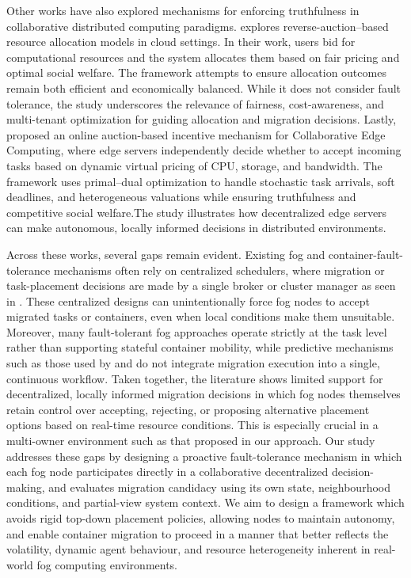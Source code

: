 \documentclass{article}
\begin{document}
Other works have also explored mechanisms for enforcing truthfulness in collaborative distributed computing paradigms. \cite{kumarFairResourceAllocation2021} explores reverse-auction–based resource allocation models in cloud settings. In their work, users bid for computational resources and the system allocates them based on fair pricing and optimal social welfare. The framework attempts to ensure allocation outcomes remain both efficient and economically balanced. While it does not consider fault tolerance, the study underscores the relevance of fairness, cost-awareness, and multi-tenant optimization for guiding allocation and migration decisions.
Lastly, \cite{heOnlineAuctionbasedIncentive2022} proposed an online auction-based incentive mechanism for Collaborative Edge Computing, where edge servers independently decide whether to accept incoming tasks based on dynamic virtual pricing of CPU, storage, and bandwidth. The framework uses primal–dual optimization to handle stochastic task arrivals, soft deadlines, and heterogeneous valuations while ensuring truthfulness and competitive social welfare.The study illustrates how decentralized edge servers can make autonomous, locally informed decisions in distributed environments.


Across these works, several gaps remain evident. Existing fog and container-fault-tolerance mechanisms often rely on centralized schedulers, where migration or task-placement decisions are made by a single broker or cluster manager as seen in \cite{palaContainerMigrationApproach2025}\cite{tranProactiveStatefulFaultTolerant2022}\cite{sharifFaulttolerantLoadBalancing2020}\cite{kashyapHybridApproachFaulttolerance2024b}. These centralized designs can unintentionally force fog nodes to accept migrated tasks or containers, even when local conditions make them unsuitable. Moreover, many fault-tolerant fog approaches operate strictly at the task level rather than supporting stateful container mobility, while predictive mechanisms such as those used by \cite{zhangFaultTolerantModelPerformance2022d} and \cite{mudassarDecentralizedLatencyAwareTask2020} do not integrate migration execution into a single, continuous workflow. Taken together, the literature shows limited support for decentralized, locally informed migration decisions in which fog nodes themselves retain control over accepting, rejecting, or proposing alternative placement options based on real-time resource conditions. This is especially crucial in a multi-owner environment such as that proposed in our approach. Our study addresses these gaps by designing a proactive fault-tolerance mechanism in which each fog node participates directly in a collaborative decentralized decision-making, and evaluates migration candidacy using its own state, neighbourhood conditions, and partial-view system context. We aim to design a framework which avoids rigid top-down placement policies, allowing nodes to maintain autonomy, and enable container migration to proceed in a manner that better reflects the volatility, dynamic agent behaviour, and resource heterogeneity inherent in real-world fog computing environments.
\end{document}
